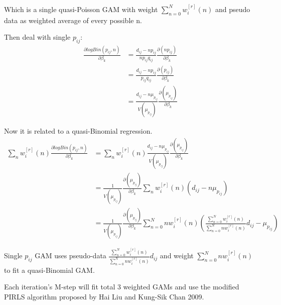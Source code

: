 \documentclass[]{article}
\begin{document}
Which is a single quasi-Poisson GAM with weight $\sum_{n=0}^{N}w_{i}^{[r]}(n)$ and pseudo data as weighted average of every possible n.

Then deal with single $p_{ij}$:
\begin{equation}
	\begin{aligned}
	\frac{\partial logBin(p_{ij},n)}{\partial \beta_{k}}&=\frac{d_{ij}-np_{ij}}{np_{ij}q_{ij}}\frac{\partial(np_{ij})}{\partial \beta_{k}}\\
	&=\frac{d_{ij}-np_{ij}}{p_{ij}q_{ij}}\frac{\partial(p_{ij})}{\partial \beta_{k}}\\
	&=\frac{d_{ij}-n\mu_{p_{ij}}}{V(\mu_{p_{ij}})}\frac{\partial(\mu_{p_{ij}})}{\partial \beta_{k}}
	\end{aligned}
\end{equation}

Now it is related to a quasi-Binomial regression.
\begin{equation}
	\begin{aligned}
	\sum_{n}w_{i}^{[r]}(n)\frac{\partial logBin(p_{ij},n)}{\partial \beta_{k}}
	&=\sum_{n}w_{i}^{[r]}(n)\frac{d_{ij}-n\mu_{p_{ij}}}{V(\mu_{p_{ij}})}\frac{\partial(\mu_{p_{ij}})}{\partial \beta_{k}}\\
	&=\frac{1}{V(\mu_{p_{ij}})}\frac{\partial(\mu_{p_{ij}})}{\partial \beta_{k}}\sum_{n}w_{i}^{[r]}(n)(d_{ij}-n\mu_{p_{ij}})\\
	&=\frac{1}{V(\mu_{p_{ij}})}\frac{\partial(\mu_{p_{ij}})}{\partial \beta_{k}}\sum_{n=0}^{N}nw_{i}^{[r]}(n)(\frac{\sum_{n=0}^{N}w_{i}^{[r]}(n)}{\sum_{n=0}^{N}nw_{i}^{[r]}(n)}d_{ij}-\mu_{p_{ij}})
	\end{aligned}
\end{equation}

Single $p_{ij}$ GAM uses pseudo-data $\frac{\sum_{n=0}^{N}w_{i}^{[r]}(n)}{\sum_{n=0}^{N}nw_{i}^{[r]}(n)}d_{ij}$ and weight $\sum_{n=0}^{N}nw_{i}^{[r]}(n)$ to fit a quasi-Binomial GAM.


Each iteration's M-step will fit total 3 weighted GAMs and use the modified PIRLS algorithm proposed by Hai Liu and Kung-Sik Chan 2009.
\end{document}
